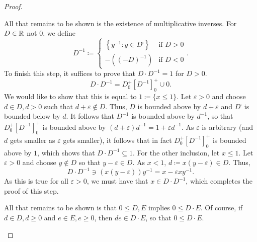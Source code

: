 \begin{thm}
\begin{proof}
\begin{savenotes}
All that remains to be shown is the existence of multiplicative inverses.  For $D\in \mathbb{R}$ not $0$, we define
\begin{equation}
D^{-1}\coloneqq \begin{cases}\left\{ y^{-1}:y\in D^{\comp}\right\} & \text{if }D>0 \\ -\left( (-D)^{-1}\right) & \text{if }D<0\end{cases}.
\end{equation}
To finish this step, it suffices to prove that $D\cdot D^{-1}=1$ for $D>0$.
\begin{equation}
D\cdot D^{-1}=D_0^+[D^{-1}]_0^+\cup 0.
\end{equation}
We would like to show that this is equal to $1\coloneqq \{ x\leq 1\}$.  Let $\varepsilon >0$ and choose $d\in D,d>0$ such that $d+\varepsilon \notin D$.  Thus, $D$ is bounded above by $d+\varepsilon$ and $D^{\comp}$ is bounded below by $d$.  It follows that $D^{-1}$ is bounded above by $d^{-1}$, so that $D_0^+[D^{-1}]_0^+$ is bounded above by $(d+\varepsilon )d^{-1}=1+\varepsilon d^{-1}$.  As $\varepsilon$ is arbitrary (and $d$ gets smaller as $\varepsilon$ gets smaller), it follows that in fact $D_0^+[D^{-1}]_0^+$ is bounded above by $1$, which shows that $D\cdot D^{-1}\subseteq 1$.  For the other inclusion, let $x\leq 1$.  Let $\varepsilon >0$ and choose $y\notin D$ so that $y-\varepsilon \in D$.  As $x<1$, $d\coloneqq x(y-\varepsilon )\in D$.  Thus,
\begin{equation}
D\cdot D^{-1}\ni \left( x(y-\varepsilon )\right) y^{-1}=x-\varepsilon xy^{-1}.
\end{equation}
As this is true for all $\varepsilon >0$, we must have that $x\in D\cdot D^{-1}$, which completes the proof of this step.

All that remains to be shown is that $0\leq D,E$ implies $0\leq D\cdot E$.  Of course, if $d\in D,d\geq 0$ and $e\in E,e\geq 0$, then $de\in D\cdot E$, so that $0\leq D\cdot E$.


\end{savenotes}
\end{proof}
\end{thm}
